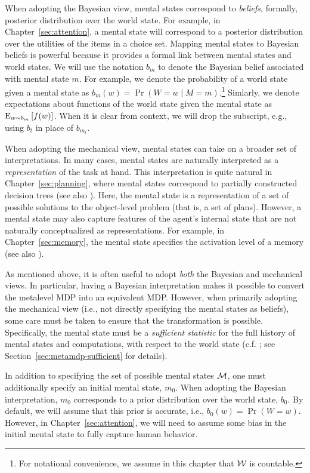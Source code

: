 When adopting the Bayesian view, mental states correspond to \emph{beliefs}, formally, posterior distribution over the world state. For example, in Chapter~\ref{sec:attention}, a mental state will correspond to a posterior distribution over the utilities of the items in a choice set. Mapping mental states to Bayesian beliefs is powerful because it provides a formal link between mental states and world states. We will use the notation $b_m$ to denote the Bayesian belief associated with mental state $m$. For example, we denote the probability of a world state given a mental state as $b_m(w) = \Pr(W = w \mid M = m)$.\footnote{%
  For notational convenience, we assume in this chapter that $\W$ is countable.
} Simlarly, we denote expectations about functions of the world state given the mental state as $\expectunder{f(w)}{w \sim b_m}$. When it is clear from context, we will drop the subscript, e.g., using $b_t$ in place of $b_{m_t}$. 

When adopting the mechanical view, mental states can take on a broader set of interpretations. In many cases, mental states are naturally interpreted as a \emph{representation} of the task at hand. This interpretation is quite natural in Chapter~\ref{sec:planning}, where mental states correspond to partially constructed decision trees (see also \citealp[Chapter 5]{hay2016principles}). Here, the mental state is a representation of a set of possible solutions to the object-level problem (that is, a set of plans). However, a mental state may also capture features of the agent's internal state that are not naturally conceptualized as representations. For example, in Chapter~\ref{sec:memory}, the mental state specifies the activation level of a memory (see also \citealp{suchow2016deciding}).

As mentioned above, it is often useful to adopt \emph{both} the Bayesian and mechanical views. In particular, having a Bayesian interpretation makes it possible to convert the metalevel MDP into an equivalent MDP. However, when primarily adopting the mechanical view (i.e., not directly specifying the mental states as beliefs), some care must be taken to ensure that the transformation is possible. Specifically, the mental state must be a \emph{sufficient statistic} for the full history of mental states and computations, with respect to the world state (c.f. \citealp{kaelbling1998planningb}; see Section~\ref{sec:metamdp-sufficient} for details).

In addition to specifying the set of possible mental states $\M$, one must additionally specify an initial mental state, $m_0$. When adopting the Bayesian interpretation, $m_0$ corresponds to a prior distribution over the world state, $b_0$. By default, we will assume that this prior is accurate, i.e., $b_0(w) = \Pr(W=w)$. However, in Chapter~\ref{sec:attention}, we will need to assume some bias in the initial mental state to fully capture human behavior.

